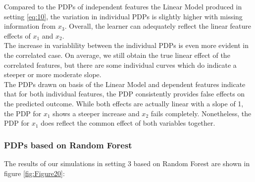 \documentclass[]{krantz}
\begin{document}
Compared to the PDPs of independent features the Linear Model produced
in setting \eqref{eq:10}, the variation in individual PDPs is slightly
higher with missing information from \(x_3\). Overall, the learner can
adequately reflect the linear feature effects of \(x_1\) and \(x_2\).\\
The increase in variablility between the individual PDPs is even more
evident in the correlated case. On average, we still obtain the true
linear effect of the correlated features, but there are some individual
curves which do indicate a steeper or more moderate slope.\\
The PDPs drawn on basis of the Linear Model and dependent features
indicate that for both individual features, the PDP consistently
provides false effects on the predicted outcome. While both effects are
actually linear with a slope of 1, the PDP for \(x_1\) shows a steeper
increase and \(x_2\) fails completely. Nonetheless, the PDP for \(x_1\)
does reflect the common effect of both variables together.

\subsubsection{PDPs based on Random
Forest}\label{pdps-based-on-random-forest-2}

The results of our simulations in setting 3 based on Random Forest are
shown in figure \ref{fig:Figure20}:
\end{document}
